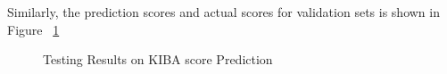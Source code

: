 Similarly, the prediction scores and actual scores for validation sets is shown in Figure ~\ref{fig:val_train}
\begin{figure}[ht]
    \caption{Testing Results on KIBA score Prediction}
    \label{fig:val_train}
\end{figure}

